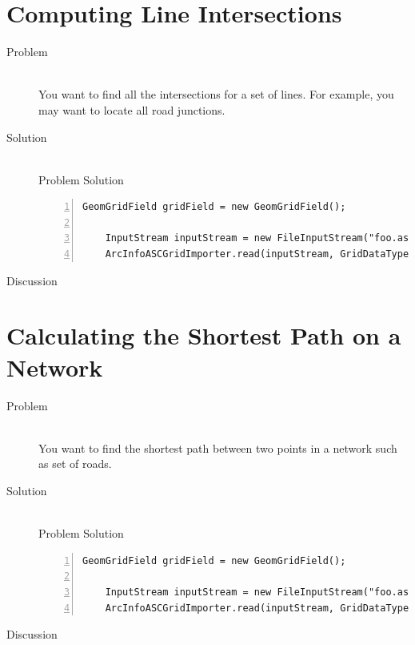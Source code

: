 \documentclass[twoside,10pt]{book}
\begin{document}
\section{Computing Line Intersections}
\label{sec:lineintersection}

\begin{description}
\item[Problem]~\\
You want to find all the intersections for a set of lines.  For
example, you may want to locate all road junctions.

\item[Solution]~\\
Problem Solution
\begin{Verbatim}[frame=lines,framesep=5mm,numbers=left,commandchars=+\[\]]
	GeomGridField gridField = new GeomGridField();
	
	InputStream inputStream = new FileInputStream("foo.asc");
	ArcInfoASCGridImporter.read(inputStream, GridDataType.INTEGER, gridField);
\end{Verbatim}

\item[Discussion ]
\end{description}



\section{Calculating the Shortest Path on a Network}
\label{sec:shortestpaths}

\begin{description}
\item[Problem]~\\
You want to find the shortest path between two points in a network
such as set of roads.

\item[Solution]~\\
Problem Solution
\begin{Verbatim}[frame=lines,framesep=5mm,numbers=left,commandchars=+\[\]]
	GeomGridField gridField = new GeomGridField();
	
	InputStream inputStream = new FileInputStream("foo.asc");
	ArcInfoASCGridImporter.read(inputStream, GridDataType.INTEGER, gridField);
\end{Verbatim}

\item[Discussion ]
\end{description}
\end{document}
